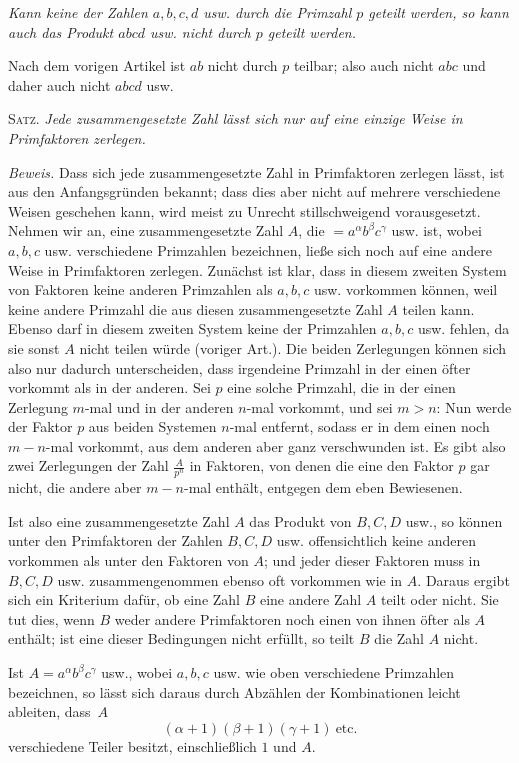 \emph{Kann keine der Zahlen $a, b, c, d$ usw. durch die Primzahl $p$ geteilt werden, so kann auch das Produkt $abcd$ usw. nicht durch $p$ geteilt werden.}

Nach dem vorigen Artikel ist $ab$ nicht durch $p$ teilbar; also auch nicht $abc$ und daher auch nicht $abcd$ usw.

\textsc{Satz}. \emph{Jede zusammengesetzte Zahl lässt sich nur auf eine einzige Weise in Primfaktoren zerlegen.}

\emph{Beweis.} Dass sich jede zusammengesetzte Zahl in Primfaktoren zerlegen lässt, ist aus den Anfangsgründen bekannt; dass dies aber nicht auf mehrere verschiedene Weisen geschehen kann, wird meist zu Unrecht stillschweigend vorausgesetzt. Nehmen wir an, eine zusammengesetzte Zahl $A$, die $=a^\alpha b^\beta c^\gamma$ usw. ist, wobei $a, b, c$ usw. verschiedene Primzahlen bezeichnen, ließe sich noch auf eine andere Weise in Primfaktoren zerlegen. Zunächst ist klar, dass in diesem zweiten System von Faktoren keine anderen Primzahlen als $a, b, c$ usw. vorkommen können, weil keine andere Primzahl die aus diesen zusammengesetzte Zahl $A$ teilen kann. Ebenso darf in diesem zweiten System keine der Primzahlen $a, b, c$ usw. fehlen, da sie sonst $A$ nicht teilen würde (voriger Art.). Die beiden Zerlegungen können sich also nur dadurch unterscheiden, dass irgendeine Primzahl in der einen öfter vorkommt als in der anderen. Sei $p$ eine solche Primzahl, die in der einen Zerlegung $m$-mal und in der anderen $n$-mal vorkommt, und sei $m>n$: Nun werde der Faktor $p$ aus beiden Systemen $n$-mal entfernt, sodass er in dem einen noch $m-n$-mal vorkommt, aus dem anderen aber ganz verschwunden ist. Es gibt also zwei Zerlegungen der Zahl $\frac{A}{p^n}$ in Faktoren, von denen die eine den Faktor $p$ gar nicht, die andere aber $m-n$-mal enthält, entgegen dem eben Bewiesenen.

Ist also eine zusammengesetzte Zahl $A$ das Produkt von $B, C, D$ usw., so können unter den Primfaktoren der Zahlen $B, C, D$ usw. offensichtlich keine anderen vorkommen als unter den Faktoren von $A$; und jeder dieser Faktoren muss in $B, C, D$ usw. zusammengenommen ebenso oft vorkommen wie in $A$. Daraus ergibt sich ein Kriterium dafür, ob eine Zahl $B$ eine andere Zahl $A$ teilt oder nicht. Sie tut dies, wenn $B$ weder andere Primfaktoren noch einen von ihnen öfter als $A$ enthält; ist eine dieser Bedingungen nicht erfüllt, so teilt $B$ die Zahl $A$ nicht.

Ist $A=a^\alpha b^\beta c^\gamma$ usw., wobei $a, b, c$ usw. wie oben verschiedene Primzahlen bezeichnen, so lässt sich daraus durch Abzählen der Kombinationen leicht ableiten, dass~$A$
\[
(\alpha+1)(\beta+1)(\gamma+1)\ \mathrm{etc.}
\]
verschiedene Teiler besitzt, einschließlich $1$ und $A$.

